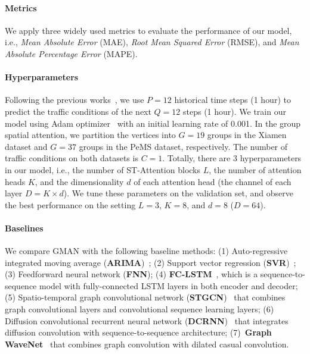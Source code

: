 \documentclass[letterpaper]{article} \usepackage{aaai20}  \usepackage{times}  \usepackage{helvet} \usepackage{courier}  \usepackage[hyphens]{url}  \usepackage{graphicx} \usepackage{amsmath}
\begin{document}
\paragraph{Metrics} 

We apply three widely used metrics to evaluate the performance of our model, i.e., \textit{Mean Absolute Error} (MAE), \textit{Root Mean Squared Error} (RMSE), and \textit{Mean Absolute Percentage Error} (MAPE).

\paragraph{Hyperparameters}

Following the previous works~\cite{Li-et-al:ICLR2018,Wu-et-al:IJCAI2019}, we use $ P=12 $ historical time steps (1 hour) to predict the traffic conditions of the next $ Q=12 $ steps (1 hour). We train our model using Adam optimizer~\cite{Kingma-and-Ba:ICLR2015} with an initial learning rate of 0.001. In the group spatial attention, we partition the vertices into $ G=19 $ groups in the Xiamen dataset and $ G=37 $ groups in the PeMS dataset, respectively. The number of traffic conditions on both datasets is $ C=1 $. Totally, there are 3 hyperparameters in our model, i.e., the number of ST-Attention blocks $ L $, the number of attention heads $ K $, and the dimensionality $ d $ of each attention head (the channel of each layer $ D = K \times d $). We tune these parameters on the validation set, and observe the best performance on the setting $ L=3 $, $ K=8 $, and $ d=8 $ ($ D=64 $).

\paragraph{Baselines}

We compare GMAN with the following baseline methods: (1) Auto-regressive integrated moving average (\textbf{ARIMA})~\cite{ARIMA:1997}; (2) Support vector regression (\textbf{SVR})~\cite{Wu-et-al:TITS2004}; (3) Feedforward neural network (\textbf{FNN}); (4) \textbf{FC-LSTM}~\cite{Sutskever-et-al:NIPS2014}, which is a sequence-to-sequence model with fully-connected LSTM layers in both encoder and decoder; (5) Spatio-temporal graph convolutional network (\textbf{STGCN})~\cite{Yu-et-al:IJCAI2018} that combines graph convolutional layers and convolutional sequence learning layers; (6) Diffusion convolutional recurrent neural network (\textbf{DCRNN})~\cite{Li-et-al:ICLR2018} that integrates diffusion convolution with sequence-to-sequence architecture; (7)~\textbf{Graph WaveNet}~\cite{Wu-et-al:IJCAI2019} that combines graph convolution with dilated casual convolution.
\end{document}
